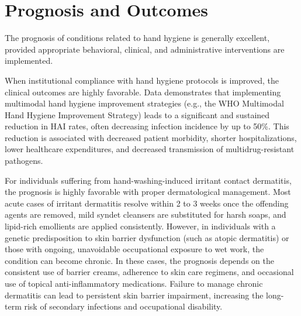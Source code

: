 \section*{Prognosis and Outcomes}
The prognosis of conditions related to hand hygiene is generally excellent, provided appropriate behavioral, clinical, and administrative interventions are implemented.

When institutional compliance with hand hygiene protocols is improved, the clinical outcomes are highly favorable. Data demonstrates that implementing multimodal hand hygiene improvement strategies (e.g., the WHO Multimodal Hand Hygiene Improvement Strategy) leads to a significant and sustained reduction in HAI rates, often decreasing infection incidence by up to 50\%. This reduction is associated with decreased patient morbidity, shorter hospitalizations, lower healthcare expenditures, and decreased transmission of multidrug-resistant pathogens.

For individuals suffering from hand-washing-induced irritant contact dermatitis, the prognosis is highly favorable with proper dermatological management. Most acute cases of irritant dermatitis resolve within 2 to 3 weeks once the offending agents are removed, mild syndet cleansers are substituted for harsh soaps, and lipid-rich emollients are applied consistently. However, in individuals with a genetic predisposition to skin barrier dysfunction (such as atopic dermatitis) or those with ongoing, unavoidable occupational exposure to wet work, the condition can become chronic. In these cases, the prognosis depends on the consistent use of barrier creams, adherence to skin care regimens, and occasional use of topical anti-inflammatory medications. Failure to manage chronic dermatitis can lead to persistent skin barrier impairment, increasing the long-term risk of secondary infections and occupational disability.

